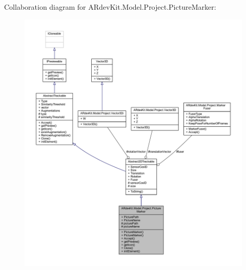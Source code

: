 Collaboration diagram for A\-Rdev\-Kit.\-Model.\-Project.\-Picture\-Marker\-:
\nopagebreak
\begin{figure}[H]
\begin{center}
\leavevmode
\includegraphics[width=350pt]{class_a_rdev_kit_1_1_model_1_1_project_1_1_picture_marker__coll__graph}
\end{center}
\end{figure}
